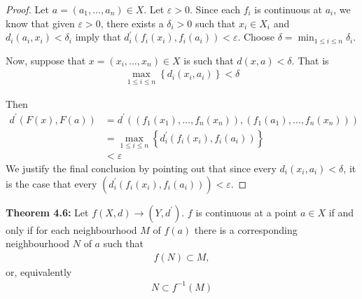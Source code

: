 \documentclass{article}
\begin{document}
\begin{proof}
    Let $a = (a_1, \dots, a_n) \in X$. Let $\varepsilon > 0$. Since each $f_i$ is continuous at $a_i$, we know that
    given $\varepsilon > 0$, there exists a $\delta_i > 0$ such that $x_i \in X_i$ and $d_i(a_i, x_i) < \delta_i$ imply that
    $d^\prime_i(f_i(x_i), f_i(a_i)) < \varepsilon$. Choose $\delta = \min_{1 \le i \le n} \delta_i$.

    Now, suppose that $x = (x_i, \dots, x_n) \in X$ is such that $d(x, a) < \delta$. That is
    \begin{align*}
        \max_{1 \le i \le n} \left\{d_i(x_i, a_i)\right\} < \delta
    \end{align*}

    Then
    \begin{align*}
        d^\prime(F(x), F(a)) &= d^\prime((f_1(x_1), \dots, f_n(x_n)), (f_1(a_1), \dots, f_n(x_n)))\\
        &= \max_{1 \le i \le n} \left\{d^\prime_i(f_i(x_i), f_i(a_i))\right\}\\
        &< \varepsilon
    \end{align*}
    We justify the final conclusion by pointing out that since every $d_i(x_i, a_i) < \delta$, it is the case
    that every $(d^\prime_i(f_i(x_i), f_i(a_i))) < \varepsilon$.
\end{proof}

\pagebreak
\textbf{Theorem 4.6:} Let $f(X, d) \to (Y, d^\prime)$. $f$ is continuous at a point $a \in X$ if and only if for each neighbourhood $M$ of $f(a)$
there is a corresponding neighbourhood $N$ of $a$ such that
\begin{align*}
    f(N) \subset M,
\end{align*}
or, equivalently
\begin{align*}
    N \subset f^{-1}(M)
\end{align*}
\end{document}
